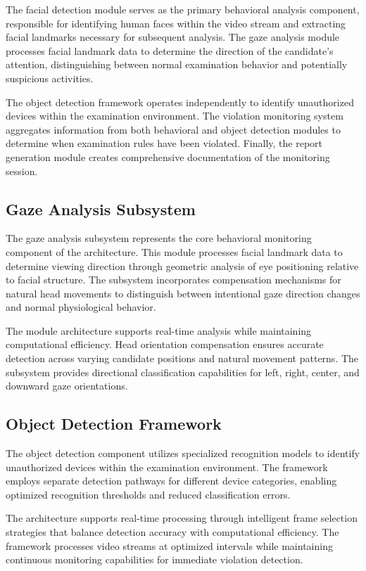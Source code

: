\documentclass[conference]{IEEEtran}
\begin{document}
The facial detection module serves as the primary behavioral analysis component, responsible for identifying human faces within the video stream and extracting facial landmarks necessary for subsequent analysis. The gaze analysis module processes facial landmark data to determine the direction of the candidate's attention, distinguishing between normal examination behavior and potentially suspicious activities.

The object detection framework operates independently to identify unauthorized devices within the examination environment. The violation monitoring system aggregates information from both behavioral and object detection modules to determine when examination rules have been violated. Finally, the report generation module creates comprehensive documentation of the monitoring session.

\subsection{Gaze Analysis Subsystem}

The gaze analysis subsystem represents the core behavioral monitoring component of the architecture. This module processes facial landmark data to determine viewing direction through geometric analysis of eye positioning relative to facial structure. The subsystem incorporates compensation mechanisms for natural head movements to distinguish between intentional gaze direction changes and normal physiological behavior.

The module architecture supports real-time analysis while maintaining computational efficiency. Head orientation compensation ensures accurate detection across varying candidate positions and natural movement patterns. The subsystem provides directional classification capabilities for left, right, center, and downward gaze orientations.

\subsection{Object Detection Framework}

The object detection component utilizes specialized recognition models to identify unauthorized devices within the examination environment. The framework employs separate detection pathways for different device categories, enabling optimized recognition thresholds and reduced classification errors.

The architecture supports real-time processing through intelligent frame selection strategies that balance detection accuracy with computational efficiency. The framework processes video streams at optimized intervals while maintaining continuous monitoring capabilities for immediate violation detection.
\end{document}
